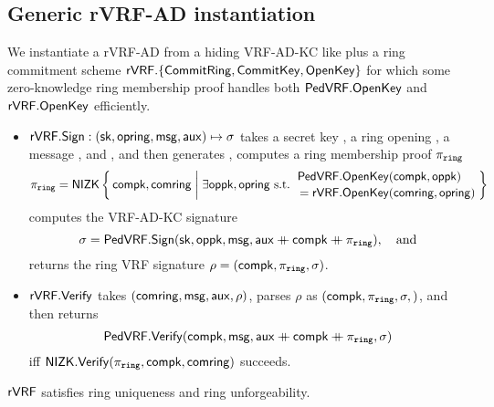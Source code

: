 \subsection{Generic rVRF-AD instantiation}

We instantiate a rVRF-AD from a hiding VRF-AD-KC like \PedVRF plus
a ring commitment scheme
 ${\mathsf{rVRF}}.\{ {\mathsf{CommitRing}}, {\mathsf{CommitKey}}, {\mathsf{OpenKey}} \}$
for which some zero-knowledge ring membership proof handles both
 ${\mathsf{PedVRF}}.{\mathsf{OpenKey}}$ and ${\mathsf{rVRF}}.{\mathsf{OpenKey}}$
efficiently.

\begin{itemize}
\item ${\mathsf{rVRF}}.{\mathsf{Sign}} : (\mathsf{sk},\mathsf{opring},\mathsf{msg},\mathsf{aux}) \mapsto \sigma$ takes
 a secret key \sk, a ring opening \openring, a message \msg, and \aux, and then %
 generates \openpk, computes a ring membership proof $\piring$
  $$ \piring = \NIZK \Setst{ \compk, \comring }{
  \exists \openpk,\openring \textrm{\ s.t.\ } 
  \genfrac{}{}{0pt}{}{\PedVRF.\OpenKey(\compk,\openpk) \quad}{\,\, = \rVRF.\OpenKey(\comring,\openring)}
  } $$
 computes the VRF-AD-KC signature
  $$ \sigma = {\mathsf{PedVRF}}.{\mathsf{Sign}}(\mathsf{sk},\mathsf{oppk},\mathsf{msg},\mathsf{aux} \mathbin{+\mkern-10mu+} \mathsf{compk} \mathbin{+\mkern-10mu+} \pi_{\mathtt{ring}}), \quad\textrm{and} $$ %
 returns the ring VRF signature $\rho = (\mathsf{compk},\pi_{\mathtt{ring}},\sigma)$.
\item ${\mathsf{rVRF}}.{\mathsf{Verify}}$ takes $(\mathsf{comring},\mathsf{msg},\mathsf{aux},\rho)$,
 parses $\rho$ as $(\mathsf{compk},\pi_{\mathtt{ring}},\sigma,)$,  and then returns
 $$ {\mathsf{PedVRF}}.{\mathsf{Verify}}(\mathsf{compk},\mathsf{msg},\mathsf{aux} \mathbin{+\mkern-10mu+} \mathsf{compk} \mathbin{+\mkern-10mu+} \pi_{\mathtt{ring}},\sigma) $$
 iff ${\mathsf{NIZK}}.{\mathsf{Verify}}(\pi_{\mathtt{ring}},\mathsf{compk},\mathsf{comring})$ succeeds. 
\end{itemize}

\begin{proposition}\label{prop:pedersen_rvrf}
${\mathsf{rVRF}}$ satisfies ring uniqueness and ring unforgeability.
\end{proposition}







\endinput










In this, we tie $\sigma$ to $\piring$ by expanding $\sigma$'s auxiliary data with $\piring$.

